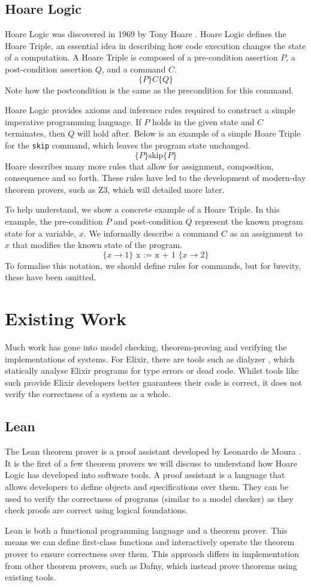 \subsection{Hoare Logic}
Hoare Logic was discovered in 1969 by Tony Hoare \cite{hoare_logic}. Hoare Logic defines the Hoare Triple, an essential idea in describing how code execution changes the state of a computation. A Hoare Triple is composed of a pre-condition assertion $P$, a post-condition assertion $Q$, and a command $C$.
\[
\{P\} C \{Q\}
\]
Note how the postcondition is the same as the precondition for this command.
\par
Hoare Logic provides axioms and inference rules required to construct a simple imperative programming language. If $P$ holds in the given state and $C$ terminates, then $Q$ will hold after. Below is an example of a simple Hoare Triple for the \texttt{skip} command, which leaves the program state unchanged.
\[
\{P\} \text{skip} \{P\}
\]
Hoare describes many more rules that allow for assignment, composition, consequence and so forth. These rules have led to the development of modern-day theorem provers, such as Z3, which will detailed more later.
\par
To help understand, we show a concrete example of a Hoare Triple. In this example, the pre-condition $P$ and post-condition $Q$ represent the known program state for a variable, $x$. We informally describe a command $C$ as an assignment to $x$ that modifies the known state of the program.
\[
\{ x \rightarrow 1 \} \text{ x := x + 1 } \{ x \rightarrow 2 \}
\]
To formalise this notation, we should define rules for commands, but for brevity, these have been omitted.

\section{Existing Work}
Much work has gone into model checking, theorem-proving and verifying the implementations of systems. For Elixir, there are tools such as dialyzer \cite{dialyzer}, which statically analyse Elixir programs for type errors or dead code. Whilst tools like such provide Elixir developers better guarantees their code is correct, it does not verify the correctness of a system as a whole. 
\subsection{Lean}
The Lean theorem prover is a proof assistant developed by Leonardo de Moura \cite{lean}. It is the first of a few theorem provers we will discuss to understand how Hoare Logic has developed into software tools. A proof assistant is a language that allows developers to define objects and specifications over them. They can be used to verify the correctness of programs (similar to a model checker) as they check proofs are correct using logical foundations.
\par
Lean is both a functional programming language and a theorem prover. This means we can define first-class functions and interactively operate the theorem prover to ensure correctness over them. This approach differs in implementation from other theorem provers, such as Dafny, which instead prove theorems using existing tools.

